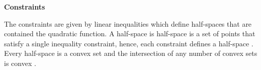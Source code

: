 \textbf{Constraints}

The constraints are given by linear inequalities which define half-spaces that are contained the quadratic function. A half-space is half-space is a set of points that satisfy a single inequality constraint, hence, each constraint defines a half-space \cite{van2005formulation}. Every half-space is a convex set and the intersection of any number of convex sets is convex \cite{Convex_constraints}.

